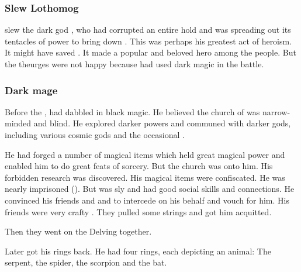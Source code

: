 \subsubsection{Slew Lothomog}
\Netzach slew the dark god , who had corrupted an entire \resphan hold and was spreading out its tentacles of power to bring down \Merkyrah. 
This was perhaps his greatest act of heroism. 
It might have saved \Merkyrah.
It made \Netzach a popular and beloved hero among the people.
But the theurges were not happy because \Netzach had used dark magic in the battle. 





\subsubsection{Dark mage}
Before the , \Zachirah had dabbled in black magic. 
He believed the church of \Merkyrah was narrow-minded and blind.
He explored darker powers and communed with darker gods, including various cosmic gods and the occasional \xs. 

He had forged a number of magical items which held great magical power and enabled him to do great feats of sorcery. 
But the church was onto him.
His forbidden research was discovered. 
His magical items were confiscated. 
He was nearly imprisoned (). 
But \Zachirah was sly and had good social skills and connections. 
He convinced his friends \Nathrach and \Damiarch and \Gevural to intercede on his behalf and vouch for him. 
His friends were very crafty \resphain.
They pulled some strings and got him acquitted. 

Then they went on the Delving together. 

Later \Zachirah got his rings back. 
He had four rings, each depicting an animal: 
The serpent, the spider, the scorpion and the bat. 

